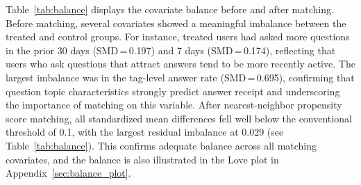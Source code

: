 Table~\ref{tab:balance} displays the covariate balance before and after matching. Before matching, several covariates showed a meaningful imbalance between the treated and control groups. For instance, treated users had asked more questions in the prior 30 days (SMD\,=\,0.197) and 7 days (SMD\,=\,0.174), reflecting that users who ask questions that attract answers tend to be more recently active. The largest imbalance was in the tag-level answer rate (SMD\,=\,0.695), confirming that question topic characteristics strongly predict answer receipt and underscoring the importance of matching on this variable. After nearest-neighbor propensity score matching, all standardized mean differences fell well below the conventional threshold of 0.1, with the largest residual imbalance at 0.029 (see Table~\ref{tab:balance}). This confirms adequate balance across all matching covariates, and the balance is also illustrated in the Love plot in Appendix~\ref{sec:balance_plot}.

